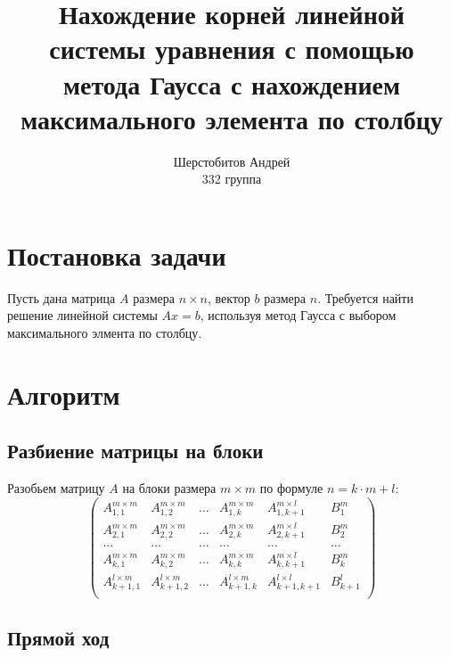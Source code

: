\documentclass[12pt]{article}
\title{Нахождение корней 
    линейной системы уравнения
    с помощью метода Гаусса с 
    нахождением максимального элемента 
    по столбцу}
\author{Шерстобитов Андрей \\
         332 группа}
\begin{document}
    \maketitle
\newpage    
    \tableofcontents
    
\newpage
    \section{Постановка задачи}

    \quad Пусть дана матрица $A$ размера $n \times n$, вектор $b$ размера $n$. 
    Требуется найти решение линейной системы $Ax = b$, используя метод
    Гаусса с выбором максимального элмента по столбцу.
    
    \section{Алгоритм}
        \subsection{Разбиение матрицы на блоки}
        \quad Разобьем матрицу $A$ на блоки размера $m \times m$ 
        по формуле $ n = k \cdot m + l $:
        \[
        \left(
        \begin{array}{ccccc|c}
            A_{1,1}^{m \times m}   & A_{1,2}^{m \times m}   & \ldots & A_{1,k}^{m \times m}   & A_{1,k+1}^{m \times l}    & B^{m}_{1}   \\
            A_{2,1}^{m \times m}   & A_{2,2}^{m \times m}   & \ldots & A_{2,k}^{m \times m}   & A_{2,k+1}^{m \times l}    & B^{m}_{2}   \\
            \ldots                 & \ldots                 & \ldots & \ldots                 & \ldots                    & \ldots      \\
            A_{k,1}^{m \times m}   & A_{k,2}^{m \times m}   & \ldots & A_{k,k}^{m \times m}   & A_{k,k+1}^{m \times l}    & B^{m}_{k}   \\
            A_{k+1,1}^{l \times m} & A_{k+1,2}^{l \times m} & \ldots & A_{k+1,k}^{l \times m} & A_{k+1, k+1}^{l \times l} & B^{l}_{k+1} \\
        \end{array}
        \right)
        \]
        
        \subsection{Прямой ход}
\end{document}
